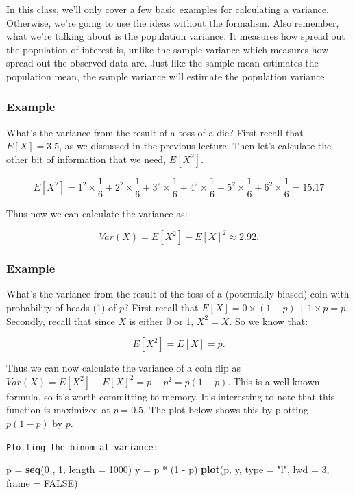 \documentclass[]{article}
\newenvironment{Shaded}{\begin{snugshade}}{\end{snugshade}}
\newcommand{\KeywordTok}[1]{\textcolor[rgb]{0.13,0.29,0.53}{\textbf{{#1}}}}
\newcommand{\DataTypeTok}[1]{\textcolor[rgb]{0.13,0.29,0.53}{{#1}}}
\newcommand{\DecValTok}[1]{\textcolor[rgb]{0.00,0.00,0.81}{{#1}}}
\newcommand{\StringTok}[1]{\textcolor[rgb]{0.31,0.60,0.02}{{#1}}}
\newcommand{\OtherTok}[1]{\textcolor[rgb]{0.56,0.35,0.01}{{#1}}}
\newcommand{\NormalTok}[1]{{#1}}
\begin{document}
In this class, we'll only cover a few basic examples for calculating a
variance. Otherwise, we're going to use the ideas without the formalism.
Also remember, what we're talking about is the population variance. It
measures how spread out the population of interest is, unlike the sample
variance which measures how spread out the observed data are. Just like
the sample mean estimates the population mean, the sample variance will
estimate the population variance.

\subsubsection{Example}\label{example-8}

What's the variance from the result of a toss of a die? First recall
that $E[X] = 3.5$, as we discussed in the previous lecture. Then let's
calculate the other bit of information that we need, $E[X^2]$.

\[E[X^2] = 1 ^ 2 \times \frac{1}{6} + 2 ^ 2 \times \frac{1}{6} + 3 ^ 2 \times \frac{1}{6} + 4 ^ 2 \times \frac{1}{6} + 5 ^ 2 \times \frac{1}{6} + 6 ^ 2 \times \frac{1}{6} = 15.17\]

Thus now we can calculate the variance as:

\[Var(X) = E[X^2] - E[X]^2 \approx 2.92.\]

\subsubsection{Example}\label{example-9}

What's the variance from the result of the toss of a (potentially
biased) coin with probability of heads (1) of $p$? First recall that
$E[X] = 0 \times (1 - p) + 1 \times p = p.$ Secondly, recall that since
$X$ is either 0 or 1, $X^2 = X$. So we know that:

\[E[X^2] = E[X] = p.\]

Thus we can now calculate the variance of a coin flip as
$Var(X) = E[X^2] - E[X]^2 = p - p^2 = p(1 - p).$ This is a well known
formula, so it's worth committing to memory. It's interesting to note
that this function is maximized at $p = 0.5$. The plot below shows this
by plotting $p(1-p)$ by $p$.

\vspace{1pc}

\verb;Plotting the binomial variance:;

\begin{Shaded}
\begin{Highlighting}[]
\NormalTok{p =}\StringTok{ }\KeywordTok{seq}\NormalTok{(}\DecValTok{0} \NormalTok{, }\DecValTok{1}\NormalTok{, }\DataTypeTok{length =} \DecValTok{1000}\NormalTok{)}
\NormalTok{y =}\StringTok{ }\NormalTok{p *}\StringTok{ }\NormalTok{(}\DecValTok{1} \NormalTok{-}\StringTok{ }\NormalTok{p)}
\KeywordTok{plot}\NormalTok{(p, y, }\DataTypeTok{type =} \StringTok{"l"}\NormalTok{, }\DataTypeTok{lwd =} \DecValTok{3}\NormalTok{, }\DataTypeTok{frame =} \OtherTok{FALSE}\NormalTok{)}
\end{Highlighting}
\end{Shaded}
\end{document}
